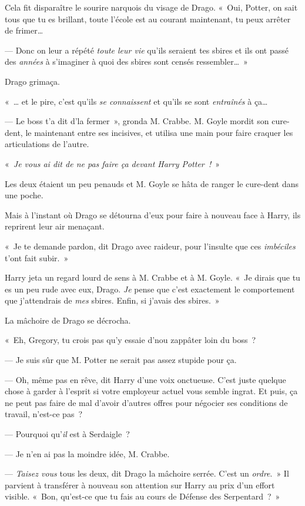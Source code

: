 Cela fit disparaître le sourire narquois du visage de Drago.
«~Oui, Potter, on sait tous que tu es brillant, toute l'école est au courant maintenant, tu peux arrêter de frimer…

--- Donc on leur a répété \emph{toute leur vie} qu'ils seraient tes sbires et ils ont passé des \emph{années} à s'imaginer à quoi des sbires sont censés ressembler…~»

Drago grimaça.

«~… et le pire, c'est qu'ils \emph{se connaissent} et qu'ils se sont \emph{entraînés} à ça…

--- Le boss t'a dit d'la fermer~», gronda M. Crabbe.
M. Goyle mordit son cure-dent, le maintenant entre ses incisives, et utilisa une main pour faire craquer les articulations de l'autre.

«~\emph{Je vous ai dit de ne pas faire ça devant Harry Potter~!}~»

Les deux étaient un peu penauds et M. Goyle se hâta de ranger le cure-dent dans une poche.

Mais à l'instant où Drago se détourna d'eux pour faire à nouveau face à Harry, ils reprirent leur air menaçant.

«~Je te demande pardon, dit Drago avec raideur, pour l'insulte que ces \emph{imbéciles} t'ont fait subir.~»

Harry jeta un regard lourd de sens à M. Crabbe et à M. Goyle.
«~Je dirais que tu es un peu rude avec eux, Drago.
\emph{Je} pense que c'est exactement le comportement que j'attendrais de \emph{mes} sbires.
Enfin, si j'avais des sbires.~»

La mâchoire de Drago se décrocha.

«~Eh, Gregory, tu crois pas qu'y essaie d'nou zappâter loin du boss~?

--- Je suis sûr que M. Potter ne serait pas assez stupide pour ça.

--- Oh, même pas en rêve, dit Harry d'une voix onctueuse.
C'est juste quelque chose à garder à l'esprit si votre employeur actuel vous semble ingrat.
Et puis, ça ne peut pas faire de mal d'avoir d'autres offres pour négocier ses conditions de travail, n'est-ce pas~?

--- Pourquoi qu'\emph{il} est à Serdaigle~?

--- Je n'en ai pas la moindre idée, M. Crabbe.

--- \emph{Taisez vous} tous les deux, dit Drago la mâchoire serrée. C'est un \emph{ordre}.~»
Il parvient à transférer à nouveau son attention sur Harry au prix d'un effort visible.
«~Bon, qu'est-ce que tu fais au cours de Défense des Serpentard~?~»

